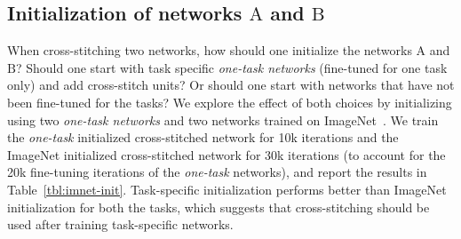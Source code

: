 \documentclass[10pt,twocolumn,letterpaper]{article}
\begin{document}
\begin{table}[t]
\setlength{\tabcolsep}{0.3em}
\centering
\footnotesize{
\caption{Scaling the learning rate of cross-stitch units wrt.\ the base network. Since the cross-stitch units are initialized in a different range from the layer parameters, we scale their learning rate for better training.}
\label{tbl:lr-init}
}
\end{table}

\subsection{Initialization of networks $\mathrm{A}$ and $\mathrm{B}$}
When cross-stitching two networks, how should one initialize the networks $\mathrm{A}$ and $\mathrm{B}$? Should one start with task specific \emph{one-task networks} (fine-tuned for one task only) and add cross-stitch units? Or should one start with networks that have not been fine-tuned for the tasks? We explore the effect of both choices by initializing using two \emph{one-task networks} and two networks trained on ImageNet~\cite{imagenet,ILSVRC15}. We train the \emph{one-task} initialized cross-stitched network for 10k iterations and the ImageNet initialized cross-stitched network for 30k iterations (to account for the 20k fine-tuning iterations of the \emph{one-task} networks), and report the results in Table~\ref{tbl:imnet-init}. Task-specific initialization performs better than ImageNet initialization for both the tasks, which suggests that cross-stitching should be used after training task-specific networks.
\end{document}
